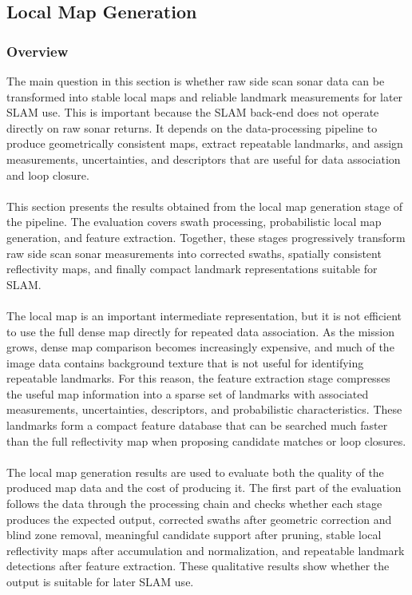 \subsection{Local Map Generation}
\subsubsection{Overview}
The main question in this section is whether raw side scan sonar data can be transformed into stable local maps and reliable landmark measurements for later SLAM use. This is important because the SLAM back-end does not operate directly on raw sonar returns. It depends on the data-processing pipeline to produce geometrically consistent maps, extract repeatable landmarks, and assign measurements, uncertainties, and descriptors that are useful for data association and loop closure.
\\ \\
This section presents the results obtained from the local map generation stage of the pipeline. The evaluation covers swath processing, probabilistic local map generation, and feature extraction. Together, these stages progressively transform raw side scan sonar measurements into corrected swaths, spatially consistent reflectivity maps, and finally compact landmark representations suitable for SLAM.
\\ \\
The local map is an important intermediate representation, but it is not efficient to use the full dense map directly for repeated data association. As the mission grows, dense map comparison becomes increasingly expensive, and much of the image data contains background texture that is not useful for identifying repeatable landmarks. For this reason, the feature extraction stage compresses the useful map information into a sparse set of landmarks with associated measurements, uncertainties, descriptors, and probabilistic characteristics. These landmarks form a compact feature database that can be searched much faster than the full reflectivity map when proposing candidate matches or loop closures.
\\ \\
The local map generation results are used to evaluate both the quality of the produced map data and the cost of producing it. The first part of the evaluation follows the data through the processing chain and checks whether each stage produces the expected output, corrected swaths after geometric correction and blind zone removal, meaningful candidate support after pruning, stable local reflectivity maps after accumulation and normalization, and repeatable landmark detections after feature extraction. These qualitative results show whether the output is suitable for later SLAM use.
